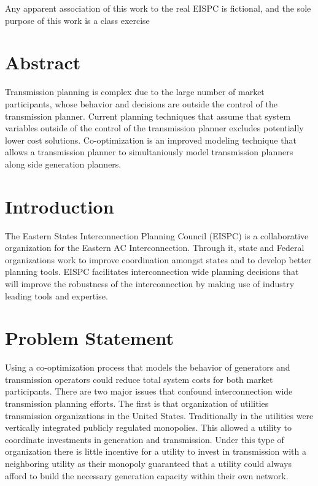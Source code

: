 \documentclass[oneside,12pt]{report}
\def\prefacesection#1{
\chapter*{#1}
\addcontentsline{toc}{chapter}{#1}
}
\begin{document}
\vfill  %
\footnoterule
\noindent \small{Any apparent association of this work to  the real EISPC is fictional, and the sole purpose of this work is a class exercise}

\prefacesection{Abstract}
Transmission planning is complex due to the large number of market participants, whose behavior and decisions are outside the control of the transmission planner. Current planning techniques that assume that system variables outside of the control of the transmission planner excludes potentially lower cost solutions. Co-optimization is an improved modeling technique that allows a transmission planner to simultaniously model transmission planners along side generation planners.


\tableofcontents

\listoffigures



\renewcommand{\thefootnote}{\arabic{footnote}}
\setcounter{footnote}{0}


\chapter{Introduction}
The Eastern States Interconnection Planning Council (EISPC) is a collaborative organization for the Eastern AC Interconnection. Through it, state and Federal organizations work to improve coordination  amongst states and to develop better planning tools. EISPC facilitates interconnection wide planning decisions that will improve the robustness of the interconnection by making use of industry leading tools and expertise. 

\chapter{Problem Statement}
Using a co-optimization process that models the behavior of generators and transmission operators could reduce total system costs for both market participants.
There are two major issues that confound interconnection wide transmission planning efforts. The first is that organization of utilities transmission organizations in the United States. Traditionally in the utilities were vertically integrated publicly regulated monopolies. This allowed a utility to coordinate investments in generation and transmission. Under this type of organization there is little incentive for a utility to invest in transmission with a neighboring utility as their monopoly guaranteed that a utility could always afford to build the necessary generation capacity within their own network.
\end{document}
